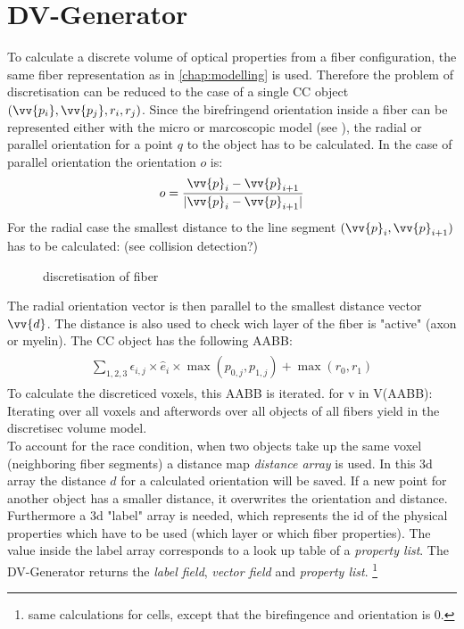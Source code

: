\section{DV-Generator}
\label{sec:dv_generator}
% 
To calculate a discrete volume of optical properties from a fiber configuration, the same fiber representation as in \cref{chap:modelling} is used.
Therefore the problem of discretisation can be reduced to the case of a single \ac{CC} object $(\vv{p_i}, \vv{p_{j}}, r_i, r_{j})$.
% 
Since the birefringend orientation inside a fiber can be represented either with the micro or marcoscopic model (see \dummy), the radial or parallel orientation for a point $q$ to the object has to be calculated.
In the case of parallel orientation the orientation $o$ is:
\begin{align}
\begin{split}
    o = \frac{\vv{p}_i - \vv{p}_{i+1}}{\abs{\vv{p}_i - \vv{p}_{i+1}}}
\end{split}
\end{align}
% 
For the radial case the smallest distance to the line segment $(\vv{p}_i,\vv{p}_{i+1})$ has to be calculated:
(see collision detection?)
% 
\begin{figure}[!tb]
\centering
{}
\caption{discretisation of fiber}
\label{fig:fiber_discretisation}
\end{figure}
% 
The radial orientation vector is then parallel to the smallest distance vector $\vv{d}$.
The distance is also used to check wich layer of the fiber is "active" (\eg axon or myelin). 
% 
The \ac{CC} object has the following \ac{AABB}:
\begin{align}
\begin{split}
    \sum_{1,2,3} \epsilon_{i,j} \times \hat{e}_i \times \max(p_{0,j}, p_{1,j}) + \max(r_0, r_1)
\end{split}
\end{align}
To calculate the discreticed voxels, this \ac{AABB} is iterated. for v in V(AABB): \dummy
% 
Iterating over all voxels and afterwords over all objects of all fibers yield in the discretisec volume model.\\
% 
To account for the race condition, when two objects take up the same voxel (\eg neighboring fiber segments) a distance map \textit{distance array} is used.
In this 3d array the distance $d$ for a calculated orientation will be saved.
If a new point for another object has a smaller distance, it overwrites the orientation and distance.
Furthermore a 3d "label" array is needed, which represents the id of the physical properties which have to be used (\eg which layer or which fiber properties).
The value inside the label array corresponds to a look up table of a \textit{property list}.
% 
The DV-Generator returns the \textit{label field}, \textit{vector field} and \textit{property list}.
% 
\footnote{same calculations for cells, except that the birefingence and orientation is 0.}
% 
